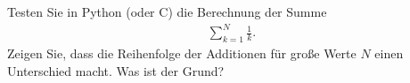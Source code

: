 Testen Sie in Python (oder C) die Berechnung der Summe
\begin{align}
	\sum_{k=1}^N \frac{1}{k}.
\end{align}
Zeigen Sie, dass die Reihenfolge der Additionen für große Werte $N$ einen Unterschied macht. Was ist der Grund?